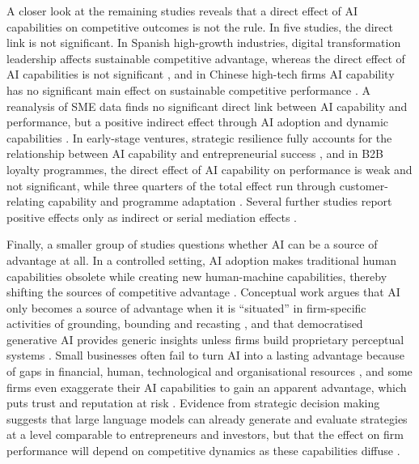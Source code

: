 A closer look at the remaining studies reveals that a direct effect of AI capabilities on competitive outcomes is not the rule. In five studies, the direct link is not significant. In Spanish high-growth industries, digital transformation leadership affects sustainable competitive advantage, whereas the direct effect of AI capabilities is not significant \parencite[1]{slrR003}, and in Chinese high-tech firms AI capability has no significant main effect on sustainable competitive performance \parencite[1]{slrR059}. A reanalysis of SME data finds no significant direct link between AI capability and performance, but a positive indirect effect through AI adoption and dynamic capabilities \parencite[1]{slrR011}. In early-stage ventures, strategic resilience fully accounts for the relationship between AI capability and entrepreneurial success \parencite[1]{wang2026}, and in B2B loyalty programmes, the direct effect of AI capability on performance is weak and not significant, while three quarters of the total effect run through customer-relating capability and programme adaptation \parencite[1]{slrR120}. Several further studies report positive effects only as indirect or serial mediation effects \parencites[1]{slrR007}[1]{slrR149}.

Finally, a smaller group of studies questions whether AI can be a source of advantage at all. In a controlled setting, AI adoption makes traditional human capabilities obsolete while creating new human-machine capabilities, thereby shifting the sources of competitive advantage \parencite[1425]{krakowski2023}. Conceptual work argues that AI only becomes a source of advantage when it is \enquote{situated} in firm-specific activities of grounding, bounding and recasting \parencite[618]{slrR087}, and that democratised generative AI provides generic insights unless firms build proprietary perceptual systems \parencite[583]{cui2024}. Small businesses often fail to turn AI into a lasting advantage because of gaps in financial, human, technological and organisational resources \parencite[1]{slrR077}, and some firms even exaggerate their AI capabilities to gain an apparent advantage, which puts trust and reputation at risk \parencite[519]{slrR148}. Evidence from strategic decision making suggests that large language models can already generate and evaluate strategies at a level comparable to entrepreneurs and investors, but that the effect on firm performance will depend on competitive dynamics as these capabilities diffuse \parencite[322]{slrR129}.

